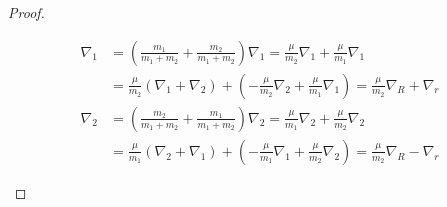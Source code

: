 \documentclass{article}
\begin{document}
\begin{proof}
\begin{itemize}
\begin{align}
            \nabla_1 &= \left(\frac{m_1}{m_1+m_2}+\frac{m_2}{m_1+m_2}\right)\nabla_1 = \frac{\mu}{m_2}\nabla_1 + \frac{\mu}{m_1}\nabla_1\\
            &= \frac{\mu}{m_2}\left(\nabla_1+\nabla_2\right) + \left(-\frac{\mu}{m_2}\nabla_2 + \frac{\mu}{m_1}\nabla_1\right) = \frac{\mu}{m_2}\nabla_R + \nabla_r
        \end{align}
         \begin{align}
            \nabla_2 &= \left(\frac{m_2}{m_1+m_2}+\frac{m_1}{m_1+m_2}\right)\nabla_2 = \frac{\mu}{m_1}\nabla_2 + \frac{\mu}{m_2}\nabla_2\\
            &= \frac{\mu}{m_1}\left(\nabla_2+\nabla_1\right) + \left(-\frac{\mu}{m_1}\nabla_1 + \frac{\mu}{m_2}\nabla_2\right) = \frac{\mu}{m_2}\nabla_R - \nabla_r
        \end{align}

        \hfil
        

\end{itemize}
\end{proof}
\end{document}
